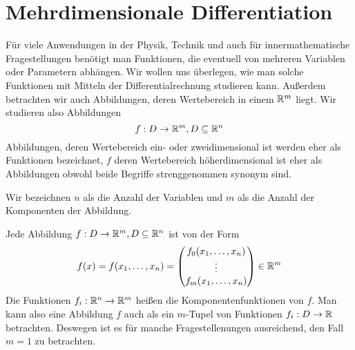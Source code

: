 \chapter{Mehrdimensionale Differentiation}
Für viele Anwendungen in der Physik, Technik und auch für innermathematische Fragestellungen benötigt man Funktionen, die eventuell von mehreren Variablen oder Parametern abhängen. Wir wollen uns überlegen, wie man solche Funktionen mit Mitteln der Differentialrechnung studieren kann. Außerdem betrachten wir auch Abbildungen, deren Wertebereich in einem $\mathbb{R}^m$ liegt.  Wir studieren also Abbildungen
\begin{equation*}
	f:D\rightarrow \mathbb{R}^m, D\subseteq \mathbb{R}^n
\end{equation*}
Abbildungen, deren Wertebereich ein- oder zweidimensional ist werden eher als Funktionen bezeichnet, $f$ deren Wertebereich höherdimensional ist eher als Abbildungen obwohl beide Begriffe strenggenommen synonym sind.

Wir bezeichnen $n$ als die Anzahl der Variablen und $m$ als die Anzahl der Komponenten der Abbildung.

Jede Abbildung $f:D\rightarrow\mathbb{R}^m, D\subseteq \mathbb{R}^n$ ist von der Form
\begin{equation*}
	f(x)=f(x_1,\ldots,x_n)=\vector{f_0(x_1,\ldots,x_n)\\\vdots\\f_m(x_1,\ldots,x_n)}\in\R^m
\end{equation*}
Die Funktionen $f_i:\mathbb{R}^n\rightarrow\mathbb{R}^m$ heißen die Komponentenfunktionen von $f$. Man kann also eine Abbildung $f$ auch als ein $m$-Tupel von Funktionen $f_i:D\rightarrow\mathbb{R}$ betrachten. Deswegen ist es für manche Fragestellenungen ausreichend, den Fall $m=1$ zu betrachten.

